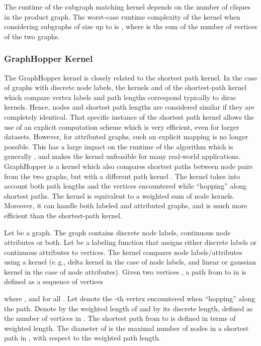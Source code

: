 \documentclass[twoside,11pt]{article}
\newcommand{\eg}{e.\,g., }
\begin{document}
The runtime of the subgraph matching kernel depends on the number of cliques in the product graph.
The worst-case runtime complexity of the kernel when considering subgraphs of size up to  is , where  is the sum of the number of vertices of the two graphs.


\subsubsection{GraphHopper Kernel}
The GraphHopper kernel is closely related to the shortest path kernel.
In the case of graphs with discrete node labels, the kernels  and  of the shortest-path kernel which compare vertex labels and path lengths correspond typically to dirac kernels.
Hence, nodes and shortest path lengths are considered similar if they are completely identical.
That specific instance of the shortest path kernel allows the use of an explicit computation scheme which is very efficient, even for larger datasets.
However, for attributed graphs, such an explicit mapping is no longer possible.
This has a large impact on the runtime of the algorithm which is generally , and makes the kernel unfeasible for many real-world applications.
GraphHopper is a kernel which also compares shortest paths between node pairs from the two graphs, but with a different path kernel
.
The kernel takes into account both path lengths and the vertices encountered while ``hopping'' along shortest paths.
The kernel is equivalent to a weighted sum of node kernels.
Moreover, it can handle both labeled and attributed graphs, and is much more efficient than the shortest-path kernel.

Let  be a graph.
The graph contains discrete node labels, continuous node attributes or both.
Let  be a labeling function that assigns either discrete labels or continuous attributes to vertices.
The kernel compares node labels/attributes using a kernel  (\eg delta kernel in the case of node labels, and linear or gaussian kernel in the case of node attributes).
Given two vertices , a path  from  to  in  is defined as a sequence of vertices

where ,  and  for all .
Let  denote the -th vertex encountered when ``hopping'' along the path.
Denote by  the weighted length of  and by  its discrete length, defined as the number of vertices in .
The shortest path  from  to  is defined in terms of weighted length.
The diameter  of  is the maximal number of nodes in a shortest path in , with respect to the weighted path length.
\end{document}
